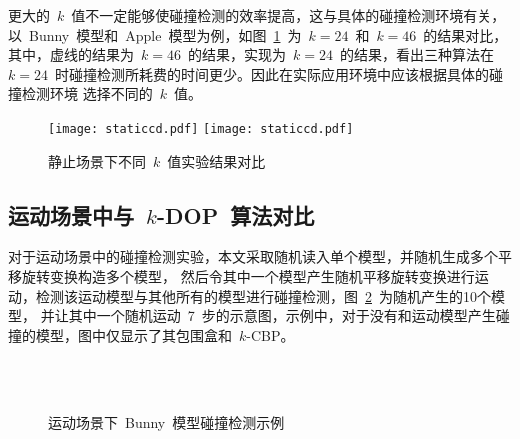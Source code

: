 更大的~$k$~值不一定能够使碰撞检测的效率提高，这与具体的碰撞检测环境有关，以~Bunny~模型和~Apple~模型为例，如图~\ref{fig:chart:exp:kdop:kcbp:k24:k46}~为~$k=24$~和~$k=46$~的结果对比，
其中，虚线的结果为~$k=46$~的结果，实现为~$k=24$~的结果，看出三种算法在~$k=24$~时碰撞检测所耗费的时间更少。因此在实际应用环境中应该根据具体的碰撞检测环境
选择不同的~$k$~值。

\begin{figure}[!ht] 
\centering
{}
{  
   \texttt{[image: staticcd.pdf]}
}
{  
    \texttt{[image: staticcd.pdf]}
}
\caption{静止场景下不同~$k$~值实验结果对比}
\label{fig:chart:exp:kdop:kcbp:k24:k46}
\end{figure}

\subsection{运动场景中与~$k$-DOP~算法对比}
\label{subsec:exper:kdop:kcbp:dynamic}

对于运动场景中的碰撞检测实验，本文采取随机读入单个模型，并随机生成多个平移旋转变换构造多个模型，
然后令其中一个模型产生随机平移旋转变换进行运动，检测该运动模型与其他所有的模型进行碰撞检测，图~\ref{fig:dynamic:cd:bunny}~为随机产生的10个模型，
并让其中一个随机运动~7~步的示意图，示例中，对于没有和运动模型产生碰撞的模型，图中仅显示了其包围盒和~$k$-CBP。

\begin{figure}[!ht]
\centering
{} 
\\ 
\\
\caption{运动场景下~Bunny~模型碰撞检测示例}
\label{fig:dynamic:cd:bunny}
\end{figure}

